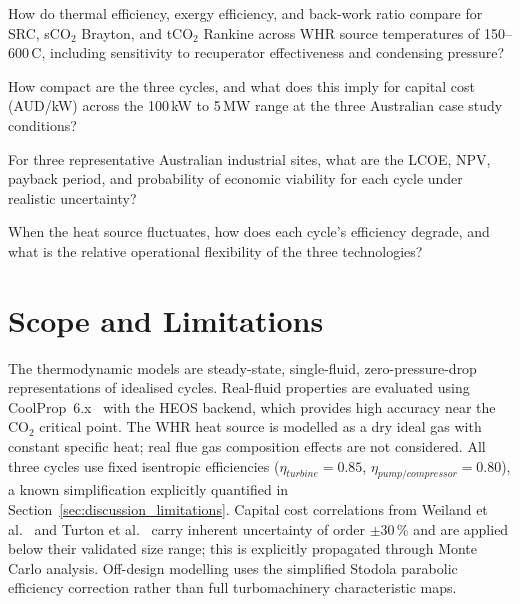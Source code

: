 \documentclass[12pt,a4paper]{report}
\begin{document}
\bigskip
\begin{description}[leftmargin=1.5em,style=nextline]
\item[\textbf{RQ1 --- Thermodynamic Performance:}]
How do thermal efficiency, exergy efficiency, and back-work ratio compare
for SRC, sCO$_2$ Brayton, and tCO$_2$ Rankine across WHR source temperatures
of 150--600\,\textdegree C, including sensitivity to recuperator effectiveness
and condensing pressure?

\item[\textbf{RQ2 --- System Compactness and Capital Cost:}]
How compact are the three cycles, and what does this imply for capital cost
(AUD/kW) across the 100\,kW to 5\,MW range at the three Australian case
study conditions?

\item[\textbf{RQ3 --- Australian Techno-Economic Analysis:}]
For three representative Australian industrial sites, what are the LCOE, NPV,
payback period, and probability of economic viability for each cycle under
realistic uncertainty?

\item[\textbf{RQ4 --- Off-Design and Part-Load Performance:}]
When the heat source fluctuates, how does each cycle's efficiency degrade,
and what is the relative operational flexibility of the three technologies?
\end{description}

\section{Scope and Limitations}
\label{sec:scope}

The thermodynamic models are steady-state, single-fluid, zero-pressure-drop
representations of idealised cycles. Real-fluid properties are evaluated using
CoolProp~6.x~\cite{Bell2014} with the HEOS backend, which provides high
accuracy near the CO$_2$ critical point. The WHR heat source is modelled as a
dry ideal gas with constant specific heat; real flue gas composition effects
are not considered. All three cycles use fixed isentropic efficiencies
($\eta_{turbine} = 0.85$, $\eta_{pump/compressor} = 0.80$), a known
simplification explicitly quantified in Section~\ref{sec:discussion_limitations}. Capital
cost correlations from Weiland et al.~\cite{Weiland2019} and Turton et
al.~\cite{Turton2012} carry inherent uncertainty of order $\pm$30\,\% and are
applied below their validated size range; this is explicitly propagated
through Monte Carlo analysis. Off-design modelling
uses the simplified Stodola parabolic efficiency correction rather than
full turbomachinery characteristic maps.
\end{document}

